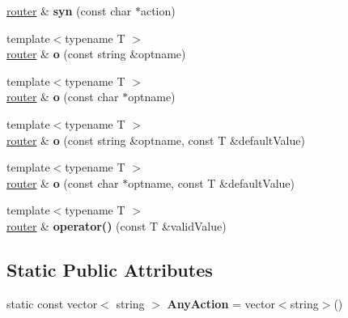 \begin{DoxyCompactItemize}
\item 
\hypertarget{classpfs_1_1cli_1_1router_af26c65a515f7c8caeb3a6dd06ac22ea6}{\hyperlink{classpfs_1_1cli_1_1router}{router} \& {\bfseries syn} (const char $\ast$action)}\label{classpfs_1_1cli_1_1router_af26c65a515f7c8caeb3a6dd06ac22ea6}

\item 
\hypertarget{classpfs_1_1cli_1_1router_a27ea658d72099ab0bacc16e70d872fca}{{\footnotesize template$<$typename T $>$ }\\\hyperlink{classpfs_1_1cli_1_1router}{router} \& {\bfseries o} (const string \&optname)}\label{classpfs_1_1cli_1_1router_a27ea658d72099ab0bacc16e70d872fca}

\item 
\hypertarget{classpfs_1_1cli_1_1router_a9217b29a68a1102bf18e2a95e13d6fd6}{{\footnotesize template$<$typename T $>$ }\\\hyperlink{classpfs_1_1cli_1_1router}{router} \& {\bfseries o} (const char $\ast$optname)}\label{classpfs_1_1cli_1_1router_a9217b29a68a1102bf18e2a95e13d6fd6}

\item 
\hypertarget{classpfs_1_1cli_1_1router_a9e01ac3a9cf07060313d58899b2b967c}{{\footnotesize template$<$typename T $>$ }\\\hyperlink{classpfs_1_1cli_1_1router}{router} \& {\bfseries o} (const string \&optname, const T \&default\-Value)}\label{classpfs_1_1cli_1_1router_a9e01ac3a9cf07060313d58899b2b967c}

\item 
\hypertarget{classpfs_1_1cli_1_1router_a9538c1f8bb2137121954f84a6c8ca39a}{{\footnotesize template$<$typename T $>$ }\\\hyperlink{classpfs_1_1cli_1_1router}{router} \& {\bfseries o} (const char $\ast$optname, const T \&default\-Value)}\label{classpfs_1_1cli_1_1router_a9538c1f8bb2137121954f84a6c8ca39a}

\item 
\hypertarget{classpfs_1_1cli_1_1router_a78d53af2e4d72aed0e935afbc2aa8a9d}{{\footnotesize template$<$typename T $>$ }\\\hyperlink{classpfs_1_1cli_1_1router}{router} \& {\bfseries operator()} (const T \&valid\-Value)}\label{classpfs_1_1cli_1_1router_a78d53af2e4d72aed0e935afbc2aa8a9d}

\end{DoxyCompactItemize}
\subsection*{Static Public Attributes}
\begin{DoxyCompactItemize}
\item 
\hypertarget{classpfs_1_1cli_1_1router_ab40316a2c0b3745ececfcdcdd0dc3e92}{static const vector$<$ string $>$ {\bfseries Any\-Action} = vector$<$string$>$()}\label{classpfs_1_1cli_1_1router_ab40316a2c0b3745ececfcdcdd0dc3e92}

\end{DoxyCompactItemize}


